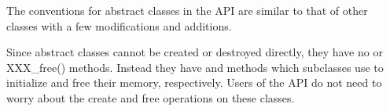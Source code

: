 \documentclass{sbmlmanual}
\begin{document}
The conventions for abstract classes in the \libsbml{} API are similar to
that of other classes with a few modifications and additions.

Since abstract classes cannot be created or destroyed directly, they have
no  or {XXX\_free()} methods.  Instead they have
 and  methods which subclasses use
to initialize and free their memory, respectively.  Users of the API do not
need to worry about the create and free operations on these classes.










\end{document}
